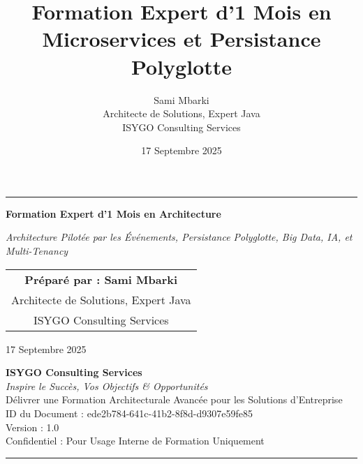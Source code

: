 \documentclass[11pt]{article}
\begin{document}
\begin{titlepage}
    \centering
    \vspace*{1cm}
    \vspace{0.5cm}
    {\color{blue}\hrule height 2pt}
    \vspace{0.5cm}
    {\LARGE \textbf{Formation Expert d'1 Mois en Architecture}\par}
    \vspace{0.3cm}
    {\large \textit{Architecture Pilotée par les Événements, Persistance Polyglotte, Big Data, IA, et Multi-Tenancy}\par}
    \vspace{1.5cm}
    \begin{tabular}{c}
        \large \textbf{Préparé par : Sami Mbarki} \\
        \large Architecte de Solutions, Expert Java \\
        \large ISYGO Consulting Services \\
    \end{tabular}
    \vspace{1cm}
    {\large 17 Septembre 2025 \par}
    \vfill
    \begin{minipage}{0.8\textwidth}
        \centering
        \small \textbf{ISYGO Consulting Services} \\
        \small \textit{Inspire le Succès, Vos Objectifs \& Opportunités} \\
        \small Délivrer une Formation Architecturale Avancée pour les Solutions d'Entreprise \\
        \vspace{0.5cm}
        \small ID du Document : ede2b784-641c-41b2-8f8d-d9307e59fe85 \\
        \small Version : 1.0 \\
        \small Confidentiel : Pour Usage Interne de Formation Uniquement
    \end{minipage}
    {\color{blue}\hrule height 2pt}
\end{titlepage}

\pagestyle{fancy}
\title{Formation Expert d'1 Mois en Microservices et Persistance Polyglotte}
\author{Sami Mbarki \\ Architecte de Solutions, Expert Java \\ ISYGO Consulting Services}
\date{17 Septembre 2025}
\maketitle
\end{document}
